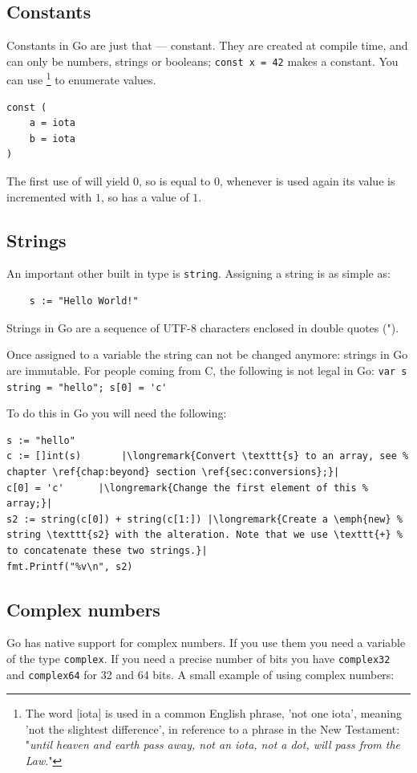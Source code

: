 \subsection{Constants}
Constants in Go are just that --- constant. They are created at compile
time, and can only be numbers, strings or booleans;
\lstinline{const x = 42} makes  a constant. You can use
\footnote{The word [iota] is used in a common English phrase,
'not one iota', meaning 'not the slightest difference', in reference to
a phrase in the New Testament: "\emph{until heaven and earth pass away, not an
iota, not a dot, will pass from the Law}."\cite{iota}}
to enumerate values.
\begin{lstlisting}
const (
	a = iota
	b = iota
)
\end{lstlisting}
The first use of  will yield $0$, so  is equal to $0$, whenever
 is used again its value is incremented with $1$, so 
has a value of $1$.

\subsection{Strings}
An important other built in type is \lstinline{string}. Assigning a
string is as simple as:
\begin{lstlisting}
    s := "Hello World!"
\end{lstlisting}
Strings in Go are a sequence of UTF-8 characters enclosed in double
quotes (").

Once assigned to a variable the string can not be changed anymore: strings in Go are
immutable. For
people coming from C, the following is not legal in Go:
\lstinline{var s string = "hello"; s[0] = 'c'} 

\noindent{}To do this in Go you will need the following:
\begin{lstlisting}
s := "hello"
c := []int(s)	    |\longremark{Convert \texttt{s} to an array, see %
chapter \ref{chap:beyond} section \ref{sec:conversions};}|
c[0] = 'c'	    |\longremark{Change the first element of this %
array;}|
s2 := string(c[0]) + string(c[1:]) |\longremark{Create a \emph{new} %
string \texttt{s2} with the alteration. Note that we use \texttt{+} %
to concatenate these two strings.}|
fmt.Printf("%v\n", s2)
\end{lstlisting}

\showremarks
\subsection{Complex numbers}
Go has native support for complex numbers. If you 
use them you need a variable of the type \lstinline{complex}. If
you need a precise number of bits you have \lstinline{complex32} and
\lstinline{complex64} for 32 and 64 bits. A small example of using complex numbers:

